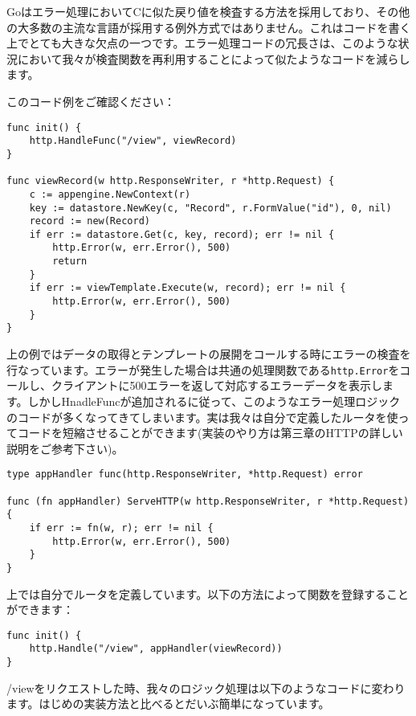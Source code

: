 Goはエラー処理においてCに似た戻り値を検査する方法を採用しており、その他の大多数の主流な言語が採用する例外方式ではありません。これはコードを書く上でとても大きな欠点の一つです。エラー処理コードの冗長さは、このような状況において我々が検査関数を再利用することによって似たようなコードを減らします。

このコード例をご確認ください：

\begin{lstlisting}[numbers=none]
func init() {
    http.HandleFunc("/view", viewRecord)
}

func viewRecord(w http.ResponseWriter, r *http.Request) {
    c := appengine.NewContext(r)
    key := datastore.NewKey(c, "Record", r.FormValue("id"), 0, nil)
    record := new(Record)
    if err := datastore.Get(c, key, record); err != nil {
        http.Error(w, err.Error(), 500)
        return
    }
    if err := viewTemplate.Execute(w, record); err != nil {
        http.Error(w, err.Error(), 500)
    }
}
\end{lstlisting}

上の例ではデータの取得とテンプレートの展開をコールする時にエラーの検査を行なっています。エラーが発生した場合は共通の処理関数である\texttt{http.Error}をコールし、クライアントに500エラーを返して対応するエラーデータを表示します。しかしHnadleFuncが追加されるに従って、このようなエラー処理ロジックのコードが多くなってきてしまいます。実は我々は自分で定義したルータを使ってコードを短縮させることができます(実装のやり方は第三章のHTTPの詳しい説明をご参考下さい)。

\begin{lstlisting}[numbers=none]
type appHandler func(http.ResponseWriter, *http.Request) error

func (fn appHandler) ServeHTTP(w http.ResponseWriter, r *http.Request) {
    if err := fn(w, r); err != nil {
        http.Error(w, err.Error(), 500)
    }
}
\end{lstlisting}

上では自分でルータを定義しています。以下の方法によって関数を登録することができます：



\begin{lstlisting}[numbers=none]
func init() {
    http.Handle("/view", appHandler(viewRecord))
}
\end{lstlisting}

/viewをリクエストした時、我々のロジック処理は以下のようなコードに変わります。はじめの実装方法と比べるとだいぶ簡単になっています。



